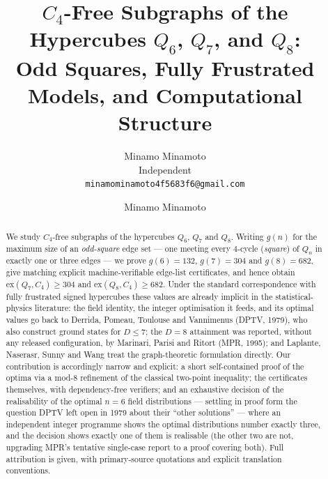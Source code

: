 \documentclass[12pt]{article}
\title{\textbf{$C_4$-Free Subgraphs of the Hypercubes $Q_6$, $Q_7$, and $Q_8$:\\
Odd Squares, Fully Frustrated Models, and Computational Structure}}
\author{Minamo Minamoto\\[4pt]
\small Independent\\
\small \texttt{minamominamoto4f5683f6@gmail.com}}
\author{Minamo Minamoto}
\newcommand{\ex}{\mathrm{ex}}
\begin{document}
\maketitle

\medskip

\begin{abstract}
We study $C_4$-free subgraphs of the hypercubes $Q_6$, $Q_7$ and $Q_8$.
Writing $g(n)$ for the maximum size of an \emph{odd-square} edge set ---
one meeting every $4$-cycle (\emph{square}) of $Q_n$ in exactly one or
three edges --- we prove $g(6)=132$, $g(7)=304$ and $g(8)=682$, give
matching explicit machine-verifiable edge-list certificates, and hence
obtain $\ex(Q_7,C_4)\ge304$ and $\ex(Q_8,C_4)\ge682$. Under the standard
correspondence with fully frustrated signed hypercubes these values are
already implicit in the statistical-physics literature: the field
identity, the integer optimisation it feeds, and its optimal values go
back to Derrida, Pomeau, Toulouse and Vannimenus (DPTV, 1979), who also
construct ground states for $D\le7$; the $D=8$ attainment was reported,
without any released configuration, by Marinari, Parisi and Ritort
(MPR, 1995); and Laplante, Naserasr, Sunny and Wang treat the graph-theoretic
formulation directly. Our contribution is accordingly narrow and
explicit: a short self-contained proof of the optima via a mod-$8$
refinement of the classical two-point inequality; the certificates
themselves, with dependency-free verifiers; and an exhaustive decision of the realisability of the optimal $n=6$
field distributions --- settling in proof form the question DPTV left open in 1979
about their ``other solutions'' --- where an independent integer
programme shows the optimal distributions number exactly three, and the
decision shows exactly one of them is realisable (the other two are not,
upgrading MPR's tentative single-case report to a proof covering both). Full attribution is given, with primary-source quotations and explicit
translation conventions.


\end{abstract}
\end{document}
